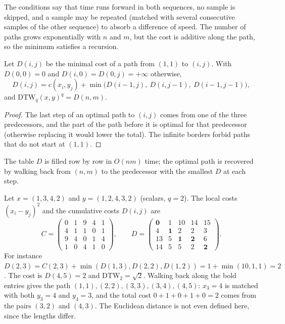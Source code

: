 \begin{notechapter}
The conditions say that time runs forward in both sequences, no sample is skipped,
and a sample may be repeated (matched with several consecutive samples of the other
sequence) to absorb a difference of speed. The number of paths grows exponentially
with $n$ and $m$, but the cost is additive along the path, so the minimum satisfies a
recursion.

\begin{proposition}\label{dtw:prop:recursion}
Let $D(i, j)$ be the minimal cost of a path from $(1, 1)$ to $(i, j)$. With $D(0, 0) = 0$ and $D(i, 0) = D(0, j) = +\infty$
otherwise,
\[
  D(i, j) = c(x_i, y_j) + \min\bigl(D(i - 1, j),\ D(i, j - 1),\ D(i - 1, j - 1)\bigr),
\]
and $\mathrm{DTW}_q(x, y)^q = D(n, m)$.
\end{proposition}

\begin{proof}
The last step of an optimal path to $(i, j)$ comes from one of the three predecessors, and the
part of the path before it is optimal for that predecessor (otherwise replacing it would
lower the total). The infinite borders forbid paths that do not start at $(1, 1)$.
\end{proof}

The table $D$ is filled row by row in $O(nm)$ time; the optimal path is recovered by
walking back from $(n, m)$ to the predecessor with the smallest $D$ at each step.

\begin{example}\label{dtw:ex:table}
Let $x = (1, 3, 4, 2)$ and $y = (1, 2, 4, 3, 2)$ (scalars, $q = 2$). The local costs $(x_i - y_j)^2$ and the
cumulative costs $D(i, j)$ are
\[
  C = \begin{pmatrix}0&1&9&4&1\\4&1&1&0&1\\9&4&0&1&4\\1&0&4&1&0\end{pmatrix},\qquad
  D = \begin{pmatrix}\mathbf0&1&10&14&15\\4&\mathbf1&2&2&3\\13&5&\mathbf1&\mathbf2&6\\14&5&5&2&\mathbf2\end{pmatrix}.
\]
For instance $D(2, 3) = C(2, 3) + \min(D(1, 3), D(2, 2), D(1, 2)) = 1 + \min(10, 1, 1) = 2$. The cost is $D(4, 5) = 2$ and
$\mathrm{DTW}_2 = \sqrt2$. Walking back along the bold entries gives the path
$(1,1), (2,2), (3,3), (3,4), (4,5)$: $x_3 = 4$ is matched with both $y_3 = 4$ and $y_4 = 3$, and the total
cost $0 + 1 + 0 + 1 + 0 = 2$ comes from the pairs $(3, 2)$ and $(4, 3)$. The Euclidean distance is not even
defined here, since the lengths differ.
\end{example}


\end{notechapter}
